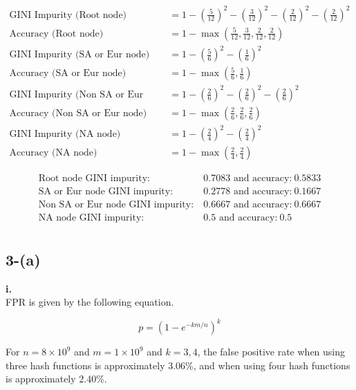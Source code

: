 \documentclass{article}
\begin{document}
\begin{align*}
    \text{GINI Impurity (Root node)} &= 1 - \left(\frac{5}{12}\right)^2 - \left(\frac{3}{12}\right)^2 - \left(\frac{2}{12}\right)^2 - \left(\frac{2}{12}\right)^2 \\
    \text{Accuracy (Root node)} &= 1 - \max\left(\frac{5}{12}, \frac{3}{12}, \frac{2}{12}, \frac{2}{12}\right) \\
    \text{GINI Impurity (SA or Eur node)} &= 1 - \left(\frac{5}{6}\right)^2 - \left(\frac{1}{6}\right)^2 \\
    \text{Accuracy (SA or Eur node)} &= 1 - \max\left(\frac{5}{6}, \frac{1}{6}\right) \\
    \text{GINI Impurity (Non SA or Eur node)} &= 1 - \left(\frac{2}{6}\right)^2 - \left(\frac{2}{6}\right)^2 - \left(\frac{2}{6}\right)^2 \\
    \text{Accuracy (Non SA or Eur node)} &= 1 - \max\left(\frac{2}{6}, \frac{2}{6}, \frac{2}{6}\right) \\
    \text{GINI Impurity (NA node)} &= 1 - \left(\frac{2}{4}\right)^2 - \left(\frac{2}{4}\right)^2 \\
    \text{Accuracy (NA node)} &= 1 - \max\left(\frac{2}{4}, \frac{2}{4}\right)
\end{align*}

\begin{align*}
    \text{Root node GINI impurity:} &\ 0.7083  \text{ and accuracy:} \ 0.5833 \\
    \text{SA or Eur node GINI impurity:} &\ 0.2778  \text{ and accuracy:} \ 0.1667 \\
    \text{Non SA or Eur node GINI impurity:} &\ 0.6667  \text{ and accuracy:} \ 0.6667 \\
    \text{NA node GINI impurity:} &\ 0.5  \text{ and accuracy:} \ 0.5 \\
\end{align*}



\subsection*{3-(a)}


\textbf{i.} \\


FPR is given by the following equation.

\[ p = (1 - e^{-km/n})^k \]


For \( n = 8 \times 10^9 \) and \( m = 1 \times 10^9 \) and \( k = 3, 4\), 
the false positive rate when using three hash functions is approximately 3.06\%, and when using four hash functions is approximately 2.40\%. \\
\end{document}
